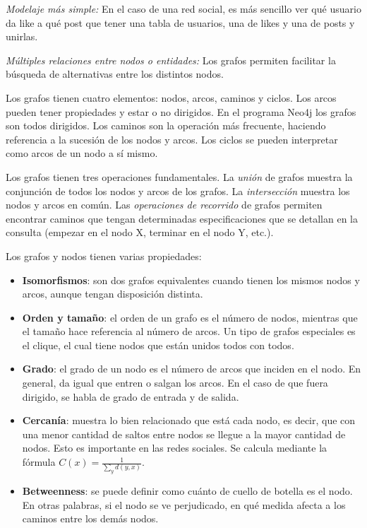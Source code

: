 \begin{itemize}
\textit{Modelaje más simple:} En el caso de una red social, es más sencillo ver qué usuario da like a qué post que tener una tabla de usuarios, una de likes y una de posts y unirlas. 

\textit{Múltiples relaciones entre nodos o entidades:} Los grafos permiten facilitar la búsqueda de alternativas entre los distintos nodos.

Los grafos tienen cuatro elementos: nodos, arcos, caminos y ciclos. Los arcos pueden tener propiedades y estar o no dirigidos. En el programa Neo4j los grafos son todos dirigidos. Los caminos son la operación más frecuente, haciendo referencia a la sucesión de los nodos y arcos. Los ciclos se pueden interpretar como arcos de un nodo a sí mismo.

Los grafos tienen tres operaciones fundamentales.
La \textit{unión} de grafos muestra la conjunción de todos los nodos y arcos de los grafos. La \textit{intersección} muestra los nodos y arcos en común. Las \textit{operaciones de recorrido} de grafos permiten encontrar caminos que tengan determinadas especificaciones que se detallan en la consulta (empezar en el nodo X, terminar en el nodo Y, etc.).

Los grafos y nodos tienen varias propiedades:
\begin{itemize}
\item \textbf{Isomorfismos}: son dos grafos equivalentes cuando tienen los mismos nodos y arcos, aunque tengan disposición distinta.
\item \textbf{Orden y tamaño}: el orden de un grafo es el número de nodos, mientras que el tamaño hace referencia al número de arcos. Un tipo de grafos especiales es el clique, el cual tiene nodos que están unidos todos con todos.
\item \textbf{Grado}: el grado de un nodo es el número de arcos que inciden en el nodo. En general, da igual que entren o salgan los arcos. En el caso de que fuera dirigido, se habla de grado de entrada y de salida. 
\item \textbf{Cercanía}: muestra lo bien relacionado que está cada nodo, es decir, que con una menor cantidad de saltos entre nodos se llegue a la mayor cantidad de nodos. Esto es importante en las redes sociales. Se calcula mediante la fórmula $C(x) = \frac{1}{\sum_y d(y,x)}$. 
\item \textbf{Betweenness}: se puede definir como cuánto de cuello de botella es el nodo. En otras palabras, si el nodo se ve perjudicado, en qué medida afecta a los caminos entre los demás nodos.
\end{itemize}


\end{itemize}
